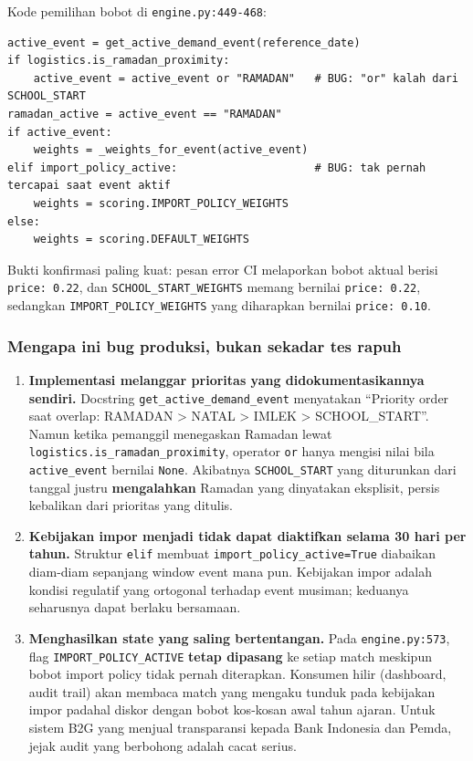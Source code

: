 \documentclass[11pt,a4paper]{article}
\newcommand{\code}[1]{\texttt{\small #1}}
\begin{document}
\noindent
Kode pemilihan bobot di \code{engine.py:449-468}:

\begin{lstlisting}
active_event = get_active_demand_event(reference_date)
if logistics.is_ramadan_proximity:
    active_event = active_event or "RAMADAN"   # BUG: "or" kalah dari SCHOOL_START
ramadan_active = active_event == "RAMADAN"
if active_event:
    weights = _weights_for_event(active_event)
elif import_policy_active:                     # BUG: tak pernah tercapai saat event aktif
    weights = scoring.IMPORT_POLICY_WEIGHTS
else:
    weights = scoring.DEFAULT_WEIGHTS
\end{lstlisting}

\noindent
Bukti konfirmasi paling kuat: pesan error CI melaporkan bobot aktual berisi \code{price: 0.22},
dan \code{SCHOOL\_START\_WEIGHTS} memang bernilai \code{price: 0.22}, sedangkan
\code{IMPORT\_POLICY\_WEIGHTS} yang diharapkan bernilai \code{price: 0.10}.

\subsubsection*{Mengapa ini bug produksi, bukan sekadar tes rapuh}

\begin{enumerate}
  \item \textbf{Implementasi melanggar prioritas yang didokumentasikannya sendiri.} Docstring
        \code{get\_active\_demand\_event} menyatakan ``Priority order saat overlap: RAMADAN >
        NATAL > IMLEK > SCHOOL\_START''. Namun ketika pemanggil menegaskan Ramadan lewat
        \code{logistics.is\_ramadan\_proximity}, operator \code{or} hanya mengisi nilai bila
        \code{active\_event} bernilai \code{None}. Akibatnya \code{SCHOOL\_START} yang diturunkan
        dari tanggal justru \textbf{mengalahkan} Ramadan yang dinyatakan eksplisit, persis
        kebalikan dari prioritas yang ditulis.
  \item \textbf{Kebijakan impor menjadi tidak dapat diaktifkan selama 30 hari per tahun.}
        Struktur \code{elif} membuat \code{import\_policy\_active=True} diabaikan diam-diam
        sepanjang window event mana pun. Kebijakan impor adalah kondisi regulatif yang ortogonal
        terhadap event musiman; keduanya seharusnya dapat berlaku bersamaan.
  \item \textbf{Menghasilkan state yang saling bertentangan.} Pada \code{engine.py:573}, flag
        \code{IMPORT\_POLICY\_ACTIVE} \textbf{tetap dipasang} ke setiap match meskipun bobot
        import policy tidak pernah diterapkan. Konsumen hilir (dashboard, audit trail) akan
        membaca match yang mengaku tunduk pada kebijakan impor padahal diskor dengan bobot
        kos-kosan awal tahun ajaran. Untuk sistem B2G yang menjual transparansi kepada Bank
        Indonesia dan Pemda, jejak audit yang berbohong adalah cacat serius.
\end{enumerate}
\end{document}
